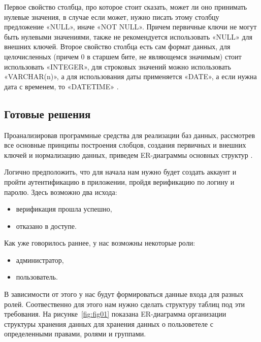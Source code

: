 Первое свойство столбца, про которое стоит сказать, может ли оно принимать нулевые значения, в случае если может, нужно писать этому столбцу предложение «NULL», иначе «NOT NULL». Причем первичные ключи не могут быть нулевыми значениями, также не рекомендуется использовать «NULL» для внешних ключей. Второе свойство столбца есть сам формат данных, для целочисленных (причем 0 в старшем бите, не являющемся значимым) стоит использовать «INTEGER», для строковых значений можно использовать «VARCHAR(n)», а для использования даты применяется «DATE», а если нужна дата с временем, то «DATETIME» \cite{online5}.




\subsection{Готовые решения}

Проанализировав программные средства для реализации баз данных, рассмотрев все основные принципы построения слобцов, создания первичных и внешних ключей и нормализацию данных, приведем ER-диаграммы основных структур \cite{book4}.

Логично предположить, что для начала нам нужно будет создать аккаунт и пройти аутентификацию в приложении, пройдя верификацию по логину и паролю. Здесь возможно два исхода:

\begin{itemize}
    \item верификация прошла успешно,
    \item отказано в доступе.
\end{itemize}

Как уже говорилось раннее, у нас возможны некоторые роли:

\begin{itemize}
    \item администратор,
    \item пользователь.
\end{itemize}

В зависимости от этого у нас будут формироваться данные входа для разных ролей. Соотвественно для этого нам нужно сделать структуру таблиц под эти требования. На рисунке~\ref{fig:fig01} показана ER-диаграмма организации структуры хранения данных для хранения данных о пользоветеле с определенными правами, ролями и группами.

